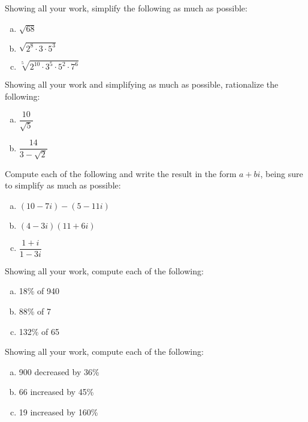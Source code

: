 \documentclass[12pt,letterpaper]{exam}
\begin{document}
\begin{questions}
\newpage
\question[10] Showing all your work, simplify the following as much as possible:
	\begin{enumerate}[(a)]
	\item $\sqrt{68}$
	\item $\sqrt{2^8 \cdot 3 \cdot 5^3}$
	\item $\sqrt[5]{2^{10} \cdot 3^5 \cdot 5^2 \cdot 7^6}$
	\end{enumerate}



\newpage
\question[10] Showing all your work and simplifying as much as possible, rationalize the following:
	\begin{enumerate}[(a)] \itemsep=0.3cm
	\item $\dfrac{10}{\sqrt{5}}$
	\item $\dfrac{14}{3 - \sqrt{2}}$
	\end{enumerate}



\newpage
\question[10] Compute each of the following and write the result in the form $a + bi$, being sure to simplify as much as possible:
	\begin{enumerate}[(a)]
	\item $(10 - 7i) - (5 - 11i)$
	\item $(4 - 3i)(11 + 6i)$
	\item $\dfrac{1 + i}{1 - 3i}$
	\end{enumerate}



\newpage
\question[10] Showing all your work, compute each of the following:
	\begin{enumerate}[(a)]
	\item 18\% of 940
	\item 88\% of 7
	\item 132\% of 65
	\end{enumerate}



\newpage
\question[10] Showing all your work, compute each of the following:
	\begin{enumerate}[(a)]
	\item 900 decreased by 36\%
	\item 66 increased by 45\%
	\item 19 increased by 160\%
	\end{enumerate}




\end{questions}
\end{document}
